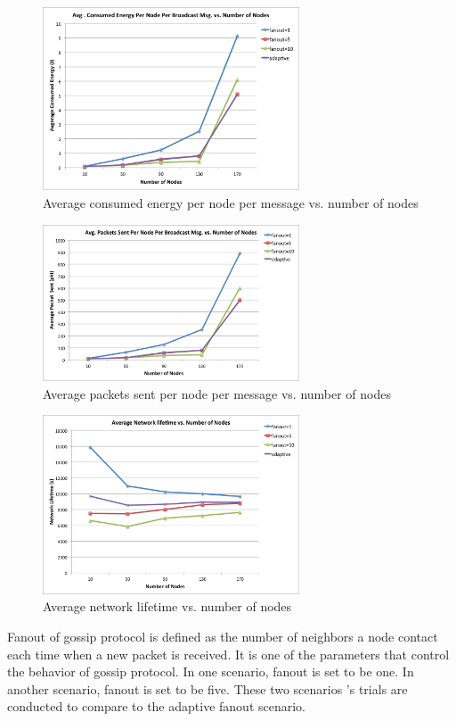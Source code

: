 \begin{figure}
	\centering
	\includegraphics[width=3in]{energy.png}
	\caption{Average consumed energy per node per message vs. number of nodes}
	\label{fig:energy}
\end{figure}

\begin{figure}
	\centering
	\includegraphics[width=3in]{overhead.png}
	\caption{Average packets sent per node per message vs. number of nodes}
	\label{fig:overhead}
\end{figure}

\begin{figure}
	\centering
	\includegraphics[width=3in]{life.png}
	\caption{Average network lifetime vs. number of nodes}
	\label{fig:life}
\end{figure}



Fanout of gossip protocol is defined as the number of neighbors a node contact each time when a new packet is received. It is one of the parameters that control the behavior of gossip protocol. In one scenario, fanout is set to be one. In another scenario, fanout is set to be five. These two scenarios 's trials are conducted to compare to the adaptive fanout scenario. 

